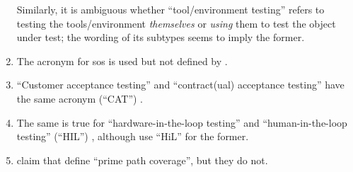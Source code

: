 \begin{enumerate}
          Similarly, it is ambiguous whether ``tool/environment testing'' refers
          to testing the tools/environment \emph{themselves} or \emph{using}
          them to test the object under test; the wording of its subtypes
          \citep[p.~25]{Firesmith2015} seems to imply the former.
    \item %
          The acronym for \acf{sos} \citep{IEEE2019b} is used but not defined
          by \citet[p.~23]{Firesmith2015}.
    \item %
          ``Customer acceptance testing'' and ``contract(ual) acceptance
          testing'' have the same acronym (``CAT'') \citep[p.~30]{Firesmith2015}.
    \item %
          The same is true for ``hardware-in-the-loop testing'' and
          ``human-in-the-loop testing'' (``HIL'') \citep[p.~23]{Firesmith2015},
          although \citet[p.~2]{PreußeEtAl2012} use ``HiL'' for the former.
    \item %
          \citet[p.~184]{DoğanEtAl2014} claim that \citet{SakamotoEtAl2013}
          define ``prime path coverage'', but they do not.


\end{enumerate}
